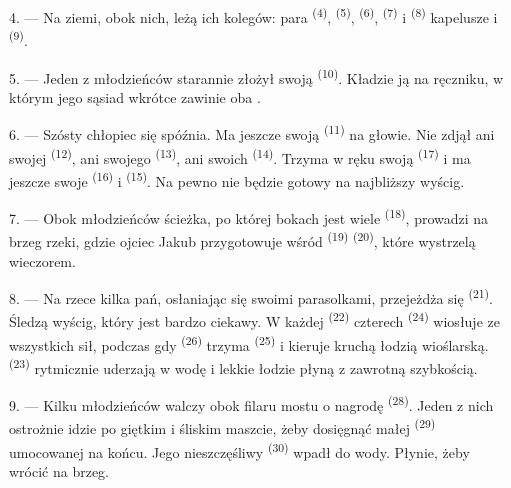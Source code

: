 4. --- Na ziemi, obok nich, leżą  ich kolegów: para 
\textsuperscript{(4)},  \textsuperscript{(5)}, 
\textsuperscript{(6)},  \textsuperscript{(7)} i 
\textsuperscript{(8)} kapelusze i  \textsuperscript{(9)}.

5. --- Jeden z młodzieńców starannie złożył swoją 
\textsuperscript{(10)}. Kładzie ją na ręczniku, w którym jego sąsiad wkrótce zawinie
oba .

6. --- Szósty chłopiec się spóźnia. Ma jeszcze swoją 
\textsuperscript{(11)} na głowie. Nie zdjął ani swojej 
\textsuperscript{(12)}, ani swojego  \textsuperscript{(13)}, ani
swoich  \textsuperscript{(14)}. Trzyma w ręku swoją
 \textsuperscript{(17)} i ma jeszcze swoje 
\textsuperscript{(16)} i  \textsuperscript{(15)}. Na pewno nie będzie
gotowy na najbliższy wyścig.

7. --- Obok młodzieńców ścieżka, po której bokach jest wiele 
\textsuperscript{(18)}, prowadzi na brzeg rzeki, gdzie ojciec Jakub przygotowuje wśród
 \textsuperscript{(19)}  \textsuperscript{(20)},
które wystrzelą wieczorem.

\VUsaut{4.4mm}
\VUsaut{3.4mm}

8. --- Na rzece kilka pań, osłaniając się swoimi parasolkami, przejeżdża się
 \textsuperscript{(21)}. Śledzą wyścig, który jest bardzo ciekawy. W
każdej  \textsuperscript{(22)} czterech 
\textsuperscript{(24)} wiosłuje ze wszystkich sił, podczas gdy 
\textsuperscript{(26)} trzyma  \textsuperscript{(25)} i kieruje kruchą
łodzią wioślarską.  \textsuperscript{(23)} rytmicznie uderzają w wodę i
lekkie łodzie płyną z zawrotną szybkością.

9. --- Kilku młodzieńców walczy obok filaru mostu o nagrodę  \textsuperscript{(28)}. Jeden z nich ostrożnie idzie po giętkim i
śliskim maszcie, żeby dosięgnąć małej  \textsuperscript{(29)}
umocowanej na końcu. Jego nieszczęśliwy  \textsuperscript{(30)}
wpadł do wody. Płynie, żeby wrócić na brzeg.


